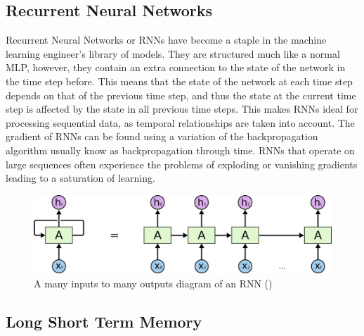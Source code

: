 \subsection{Recurrent Neural Networks}

Recurrent Neural Networks or RNNs have become a staple in the machine learning engineer's library of models. 
They are structured much like a normal MLP, however, they contain an extra connection to the state of the network in the time step before.
This means that the state of the network at each time step depends on that of the previous time step, and thus the state at the current time step is affected by the state in all previous time steps.
This makes RNNs ideal for processing sequential data, as temporal relationships are taken into account.
The gradient of RNNs can be found using a variation of the backpropagation algorithm usually know as backpropagation through time.
RNNs that operate on large sequences often experience the problems of exploding or vanishing gradients leading to a saturation of learning.

\begin{figure}
    \centering
    \includegraphics[width=0.8\columnwidth]{Figures/RNN}
    \decoRule
    \caption[An RNN]{A many inputs to many outputs diagram of an RNN (\cite{oinkina})}
    \label{fig:RNN}
\end{figure}

\subsection{Long Short Term Memory}

